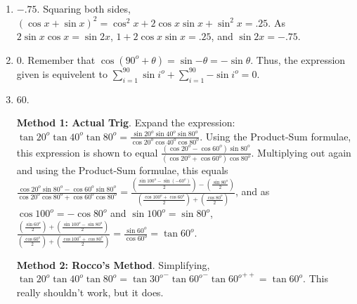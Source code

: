 \documentclass[12pt, letterpaper]{article}
\begin{document}
\begin{enumerate}

\item \textbf{$-.75$}.  Squaring both sides, $(\cos{x} + \sin{x})^2 = \cos^2{x} + 2\cos{x}\sin{x} + \sin^2{x} = .25$.  As $2\sin{x}\cos{x} = \sin{2x}$, $1 + 2\cos{x}\sin{x} = .25$, and $\sin{2x} = -.75$.

\item \textbf{$0$}.  Remember that $\cos(90^{o}+\theta) = \sin{-\theta} = -\sin{\theta}$.  Thus, the expression given is equivelent to $\displaystyle\sum_{i=1}^{90}{\sin{i^{o}}} + \sum_{i=1}^{90}{-\sin{i^{o}}} = 0$.

\item \textbf{$60$}.

\par \textbf{Method 1: Actual Trig}. Expand the expression: $\tan{20^{o}}\tan{40^{o}}\tan{80^{o}} = \frac{\sin{20^{o}}\sin{40^{o}}\sin{80^{o}}}{\cos{20^{o}}\cos{40^{o}}\cos{80^{o}}}$.  Using the Product-Sum formulae, this expression is shown to equal $\frac{(\cos{20^{o}}-\cos{60^{o}})\sin{80^{o}}}{(\cos{20^{o}} + \cos{60^{o}})\cos{80^{o}}}$.  Multiplying out again and using the Product-Sum formulae, this equals $\frac{\cos{20^{o}}\sin{80^{o}} - \cos{60^{o}}\sin{80^{o}}}{\cos{20^{o}}\cos{80^{o}} + \cos{60^{o}}\cos{80^{o}}} = \frac{(\frac{\sin{100^{o}}-\sin{(-60^{o})}}{2}) - (\frac{\sin{80^{o}}}{2})}{(\frac{\cos{100^{o}}+\cos{60^{o}}}{2}) + (\frac{\cos{80^{o}}}{2})}$, and as $\cos{100^{o}} = -\cos{80^{o}}$ and $\sin{100^{o}} = \sin{80^{o}}$, $\frac{(\frac{\sin{60^{o}}}{2}) + (\frac{\sin{100^{o}}-\sin{80^{o}}}{2})}{(\frac{\cos{60^{o}}}{2}) + (\frac{\cos{100^{o}}+\cos{80^{o}}}{2})} = \frac{\sin{60^{o}}}{\cos{60^{o}}} = \tan{60^{o}}$.

\par \textbf{Method 2: Rocco's Method}.  Simplifying, $\tan{20^{o}}\tan{40^{o}}\tan{80^{o}} = \tan{30^{o}}^{-}\tan{60^{o}}^{-}\tan{60^{o}}^{++} = \tan{60^{o}}$.  This really shouldn't work, but it does.

\end{enumerate}
\end{document}
